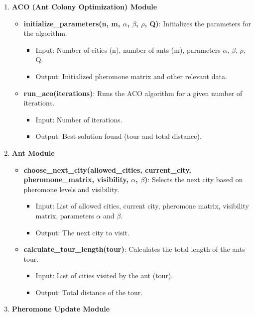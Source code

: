 \documentclass[
]{article}
\begin{document}
\begin{enumerate}
\def\labelenumi{\arabic{enumi}.}
\item
  \textbf{ACO (Ant Colony Optimization) Module}

  \begin{itemize}
  \item
    \textbf{initialize\_parameters(n, m, $\alpha$, $\beta$, $\rho$, Q)}: Initializes the
    parameters for the algorithm.

    \begin{itemize}
    \item
      Input: Number of cities (n), number of ants (m), parameters $\alpha$, $\beta$,
      $\rho$, Q.
    \item
      Output: Initialized pheromone matrix and other relevant data.
    \end{itemize}
  \item
    \textbf{run\_aco(iterations)}: Runs the ACO algorithm for a given
    number of iterations.

    \begin{itemize}
    \item
      Input: Number of iterations.
    \item
      Output: Best solution found (tour and total distance).
    \end{itemize}
  \end{itemize}
\item
  \textbf{Ant Module}

  \begin{itemize}
  \item
    \textbf{choose\_next\_city(allowed\_cities, current\_city,
    pheromone\_matrix, visibility, $\alpha$, $\beta$)}: Selects the next city based
    on pheromone levels and visibility.

    \begin{itemize}
    \item
      Input: List of allowed cities, current city, pheromone matrix,
      visibility matrix, parameters $\alpha$ and $\beta$.
    \item
      Output: The next city to visit.
    \end{itemize}
  \item
    \textbf{calculate\_tour\_length(tour)}: Calculates the total length
    of the ant\textquotesingle s tour.

    \begin{itemize}
    \item
      Input: List of cities visited by the ant (tour).
    \item
      Output: Total distance of the tour.
    \end{itemize}
  \end{itemize}
\item
  \textbf{Pheromone Update Module}


\end{enumerate}
\end{document}
